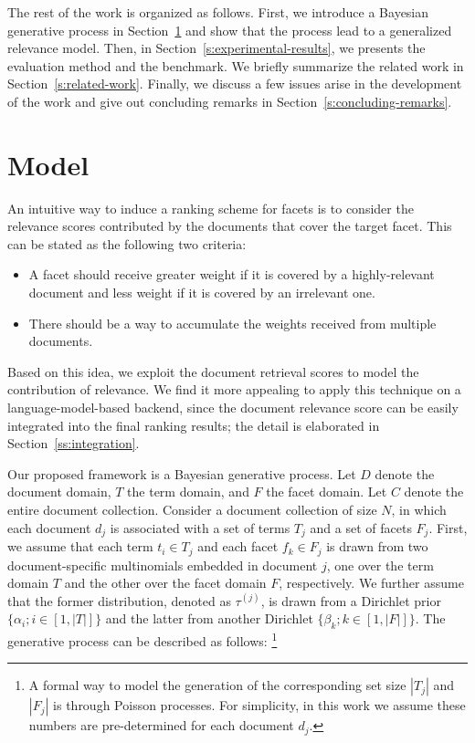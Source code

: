 The rest of the work is organized as follows.  First, we introduce a Bayesian
generative process in Section~\ref{s:model} and show that the process lead to a
generalized relevance model.  Then, in Section~\ref{s:experimental-results}, we
presents the evaluation method and the benchmark.  We briefly summarize the
related work in Section~\ref{s:related-work}.  Finally, we discuss a few issues
arise in the development of the work and give out concluding remarks in
Section~\ref{s:concluding-remarks}.

\section{Model}\label{s:model}

An intuitive way to induce a ranking scheme for facets is to consider the
relevance scores contributed by the documents that cover the target facet.
This can be stated as the following two criteria: \begin{itemize} \item A facet
should receive greater weight if it is covered by a highly-relevant document and
less weight if it is covered by an irrelevant one. \item There
should be a way to accumulate the weights received from multiple documents.
\end{itemize} Based on this idea, we exploit the document retrieval scores to
model the contribution of relevance.  We find it more appealing to apply this
technique on a language-model-based backend, since the document relevance score
can be easily integrated into the final ranking results; the detail is
elaborated in Section~\ref{ss:integration}.

Our proposed framework is a Bayesian generative process.  Let $D$ denote the document
domain, $T$ the term domain, and $F$ the facet domain.  Let $C$ denote the
entire document collection.  Consider a document collection of size $N$, in
which each document $d_j$ is associated with a set of terms $T_j$ and a set of
facets $F_j$.  First, we assume that each term $t_i \in T_j$ and each facet
$f_k \in F_j$ is drawn from two document-specific multinomials embedded
in document $j$, one over the term domain $T$ and the other over the facet domain $F$,
respectively.  We further assume that the former distribution, denoted as
$\tau^{(j)}$, is drawn from a Dirichlet prior $\{ \alpha_i; i \in [1, |T|] \}$
and the latter from another Dirichlet $\{ \beta_k; k \in [1, |F|] \}$.  The
generative process can be described as follows: \footnote{A formal way to model
the generation of the corresponding set size $|T_j|$ and $|F_j|$ is through
Poisson processes.  For simplicity, in this work we assume these numbers are
pre-determined for each document $d_j$.} 

